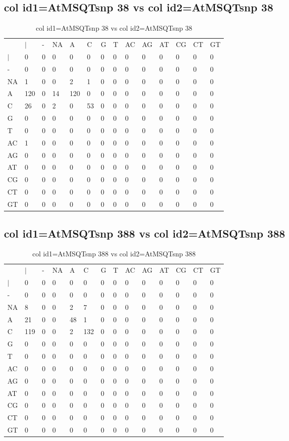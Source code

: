 \subsection{col id1=AtMSQTsnp 38 vs col id2=AtMSQTsnp 38}
\begin{center}
\begin{longtable}{|l|l|l|l|l|l|l|l|l|l|l|l|l|l|}
\caption{col id1=AtMSQTsnp 38 vs col id2=AtMSQTsnp 38} \label{table_dm892}\\
\hline
\\
\hline
&$|$&-&NA&A&C&G&T&AC&AG&AT&CG&CT&GT\\
$|$&0&0&0&0&0&0&0&0&0&0&0&0&0\\
-&0&0&0&0&0&0&0&0&0&0&0&0&0\\
NA&1&0&0&2&1&0&0&0&0&0&0&0&0\\
A&120&0&14&120&0&0&0&0&0&0&0&0&0\\
C&26&0&2&0&53&0&0&0&0&0&0&0&0\\
G&0&0&0&0&0&0&0&0&0&0&0&0&0\\
T&0&0&0&0&0&0&0&0&0&0&0&0&0\\
AC&1&0&0&0&0&0&0&0&0&0&0&0&0\\
AG&0&0&0&0&0&0&0&0&0&0&0&0&0\\
AT&0&0&0&0&0&0&0&0&0&0&0&0&0\\
CG&0&0&0&0&0&0&0&0&0&0&0&0&0\\
CT&0&0&0&0&0&0&0&0&0&0&0&0&0\\
GT&0&0&0&0&0&0&0&0&0&0&0&0&0\\
\hline
\end{longtable}
\end{center}

\subsection{col id1=AtMSQTsnp 388 vs col id2=AtMSQTsnp 388}
\begin{center}
\begin{longtable}{|l|l|l|l|l|l|l|l|l|l|l|l|l|l|}
\caption{col id1=AtMSQTsnp 388 vs col id2=AtMSQTsnp 388} \label{table_dm894}\\
\hline
\\
\hline
&$|$&-&NA&A&C&G&T&AC&AG&AT&CG&CT&GT\\
$|$&0&0&0&0&0&0&0&0&0&0&0&0&0\\
-&0&0&0&0&0&0&0&0&0&0&0&0&0\\
NA&8&0&0&2&7&0&0&0&0&0&0&0&0\\
A&21&0&0&48&1&0&0&0&0&0&0&0&0\\
C&119&0&0&2&132&0&0&0&0&0&0&0&0\\
G&0&0&0&0&0&0&0&0&0&0&0&0&0\\
T&0&0&0&0&0&0&0&0&0&0&0&0&0\\
AC&0&0&0&0&0&0&0&0&0&0&0&0&0\\
AG&0&0&0&0&0&0&0&0&0&0&0&0&0\\
AT&0&0&0&0&0&0&0&0&0&0&0&0&0\\
CG&0&0&0&0&0&0&0&0&0&0&0&0&0\\
CT&0&0&0&0&0&0&0&0&0&0&0&0&0\\
GT&0&0&0&0&0&0&0&0&0&0&0&0&0\\
\hline
\end{longtable}
\end{center}

